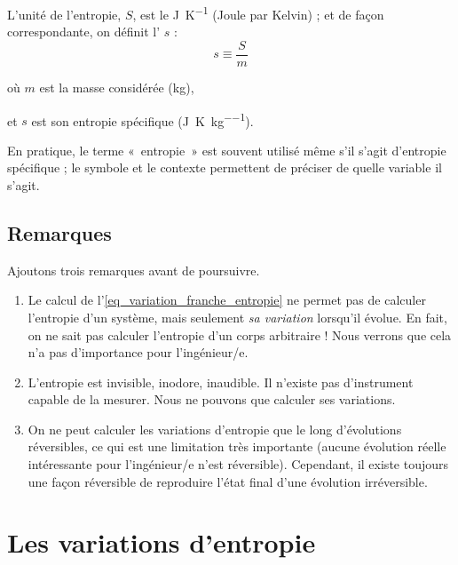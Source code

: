 		L’unité de l’entropie, $S$, est le \si{\joule\per\kelvin} (Joule par Kelvin) ; et de façon correspondante, on définit l’ $s$ :
		\begin{equation}
			s \equiv  \frac{S}{m}
		\end{equation}

		\begin{equationterms}
			\item où \tab $m$ \tab est la masse considérée (\si{\kilogram}),
			\item et \tab $s$ \tab est son entropie spécifique (\si{\joule\per\kelvin\per\kilogram}).
		\end{equationterms}

		En pratique, le terme «~entropie~» est souvent utilisé même s’il s’agit d’entropie spécifique ; le symbole et le contexte permettent de préciser de quelle variable il s’agit.

		
	\subsection{Remarques}
	
		Ajoutons trois remarques avant de poursuivre.
		
			\begin{enumerate}
			
				\item Le calcul de l’\cref{eq_variation_franche_entropie} ne permet pas de calculer l’entropie d’un système, mais seulement \emph{sa variation} lorsqu’il évolue. En fait, on ne sait pas calculer l’entropie d’un corps arbitraire ! Nous verrons que cela n’a pas d’importance pour l’ingénieur/e.
		
				\item L’entropie est invisible, inodore, inaudible. Il n’existe pas d’instrument capable de la mesurer. Nous ne pouvons que calculer ses variations.

				\item On ne peut calculer les variations d’entropie que le long d’évolutions réversibles, ce qui est une limitation très importante (aucune évolution réelle intéressante pour l’ingénieur/e n’est réversible). Cependant, il existe toujours une façon réversible de reproduire l’état final d’une évolution irréversible. 
				
			\end{enumerate}
			

\section{Les variations d’entropie}

